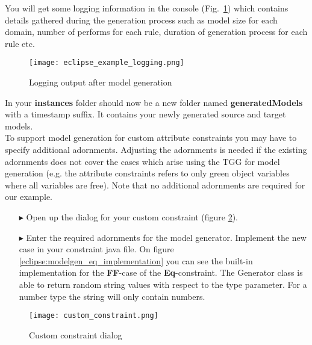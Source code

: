 You will get some logging information in the console (Fig.~\ref{eclipse:modelgen_log}) which contains
details gathered during the generation process such as model size for each domain, number of performs for
each rule, duration of generation process for each rule etc.


\begin{figure}[htbp]
\renewcommand\figurename{Figure} 
\begin{center}
\texttt{[image: eclipse\_example\_logging.png]}
\caption{Logging output after model generation}
\label{eclipse:modelgen_log}
\end{center}
\end{figure}

In your \textbf{instances} folder should now be a new folder named
\textbf{generatedModels} with a timestamp suffix. It contains your newly generated
source and target models. \\



To support model generation for custom attribute constraints you may have to specify additional adornments. 
Adjusting the adornments is needed if the existing adornments does not cover the cases 
which arise using the TGG for model generation (e.g. the attribute constraints refers to only green object variables where all variables are free). 
Note that no additional adornments are required for our example.
\begin{itemize}

\item[$\blacktriangleright$] Open up the dialog for your custom constraint (figure \ref{fig:custom_constraint_definition}).

\item[$\blacktriangleright$] Enter the required adornments for the model
generator. Implement the new case in your constraint java
file. On figure \ref{eclipse:modelgen_eq_implementation} you can see the built-in implementation for the
\textbf{FF}-case of the \textbf{Eq}-constraint. The Generator class is able to
return random string values with respect to the type parameter. For a number
type the string will only contain numbers.

\end{itemize}

\begin{figure}[hbt] 
\centering 
\texttt{[image: custom\_constraint.png]}
\caption{Custom constraint dialog}
\label{fig:custom_constraint_definition}
\end{figure}
 


